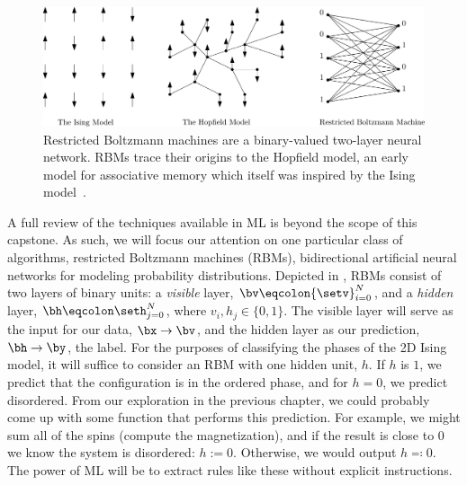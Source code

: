 \begin{figure}[ht]
  \centering
  \includegraphics[width=\textwidth]{figures/evolution-anns.pdf}
  \caption{Restricted Boltzmann machines are a binary-valued two-layer
    neural network. RBMs trace their origins to the Hopfield model, an
    early model for associative memory which itself was inspired by
    the Ising model~\cite{hopfield}.\label{fig:rbm} }
\end{figure}

A full review of the techniques available in ML is beyond the scope of
this capstone. As such, we will focus our attention on one particular
class of algorithms, restricted Boltzmann machines (RBMs),
bidirectional artificial neural networks for modeling probability
distributions.  Depicted in , RBMs consist of two layers
of binary units: a \textit{visible} layer,
${\bv}\eqcolon{\setv}_{i=0}^N$, and a \textit{hidden} layer,
$\bh\eqcolon\seth_{j=0}^N$, where $v_i,h_j\in\{0,1\}$. The visible
layer will serve as the input for our data, $\bx\rightarrow\bv$, and
the hidden layer as our prediction, $\bh\rightarrow\by$, the
label. For the purposes of classifying the phases of the 2D Ising
model, it will suffice to consider an RBM with one hidden unit,
$h$. If $h$ is $1$, we predict that the configuration is in the
ordered phase, and for $h=0$, we predict disordered. From our
exploration in the previous chapter, we could probably come up with
some function that performs this prediction. For example, we might sum
all of the spins (compute the magnetization), and if the result is
close to $0$ we know the system is disordered: $h:=0$. Otherwise, we would output $h\eqcolon 0$. The power of ML
will be to extract rules like these without explicit instructions.

